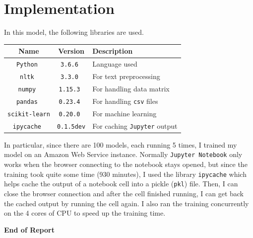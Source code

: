 \documentclass[12pt]{article}
\theoremstyle{remark}
\begin{document}
\section{Implementation}
In this model, the following libraries are used.
\begin{center}
	\begin{tabular}{ccl}
		\toprule
		Name                  & Version           & Description                         \\\midrule
		\texttt{Python      } & \texttt{3.6.6   } & Language used                       \\\midrule
		\texttt{nltk        } & \texttt{3.3.0   } & For text preprocessing              \\\midrule
		\texttt{numpy       } & \texttt{1.15.3  } & For handling data matrix            \\\midrule
		\texttt{pandas      } & \texttt{0.23.4  } & For handling \texttt{csv} files     \\\midrule
		\texttt{scikit-learn} & \texttt{0.20.0  } & For machine learning                \\\midrule
		\texttt{ipycache    } & \texttt{0.1.5dev} & For caching \texttt{Jupyter} output \\\bottomrule
	\end{tabular}
\end{center}
In particular, since there are 100 models, each running 5 times, I trained my model on an Amazon Web Service instance. Normally \texttt{Jupyter Notebook} only works when the browser connecting to the notebook stays opened, but since the training took quite some time (930 minutes), I used the library \texttt{ipycache} which helps cache the output of a notebook cell into a pickle (\texttt{pkl}) file. Then, I can close the browser connection and after the cell finished running, I can get back the cached output by running the cell again. I also ran the training concurrently on the 4 cores of CPU to speed up the training time.

\begin{center}
	\textbf{End of Report}
\end{center}
\end{document}
